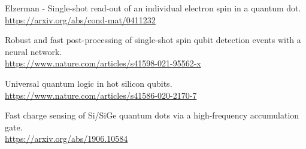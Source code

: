 

Elzerman - Single-shot read-out of an individual electron spin in a quantum dot.\\
\url{https://arxiv.org/abs/cond-mat/0411232}

Robust and fast post-processing of single-shot spin qubit detection events with a neural network.\\
\url{https://www.nature.com/articles/s41598-021-95562-x}

Universal quantum logic in hot silicon qubits.\\
\url{https://www.nature.com/articles/s41586-020-2170-7}

Fast charge sensing of Si/SiGe quantum dots via a high-frequency accumulation gate.\\
\url{https://arxiv.org/abs/1906.10584}
